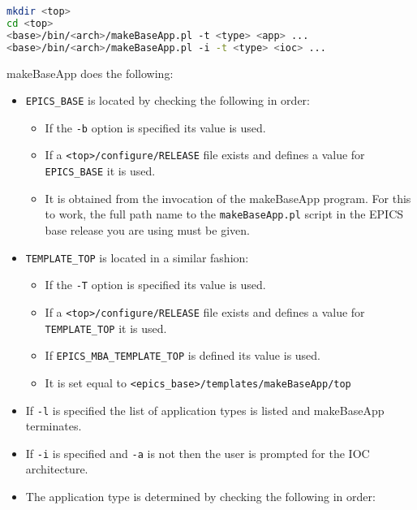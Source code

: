 \begin{lstlisting}[language=sh]
mkdir <top>
cd <top>
<base>/bin/<arch>/makeBaseApp.pl -t <type> <app> ... 
<base>/bin/<arch>/makeBaseApp.pl -i -t <type> <ioc> ...
\end{lstlisting}

makeBaseApp does the following:

\begin{itemize}
\item \verb|EPICS_BASE| is located by checking the following in order:

\begin{itemize}
\item If the \verb|-b| option is specified its value is used.

\item If a \verb|<top>/configure/RELEASE| file exists and defines a value for \verb|EPICS_BASE| it is used.

\item It is obtained from the invocation of the makeBaseApp program.
For this to work, the full path name to the \verb|makeBaseApp.pl| script in the EPICS base release you are using must be given.
\end{itemize}

\item \verb|TEMPLATE_TOP| is located in a similar fashion:

\begin{itemize}
\item If the \verb|-T| option is specified its value is used.

\item If a \verb|<top>/configure/RELEASE| file exists and defines a value for \verb|TEMPLATE_TOP| it is used.

\item If \verb|EPICS_MBA_TEMPLATE_TOP| is defined its value is used.

\item It is set equal to \verb|<epics_base>/templates/makeBaseApp/top|
\end{itemize}

\item If \verb|-l| is specified the list of application types is listed and makeBaseApp terminates.

\item If \verb|-i| is specified and \verb|-a| is not then the user is prompted for the IOC architecture.

\item The application type is determined by checking the following in order:


\end{itemize}
